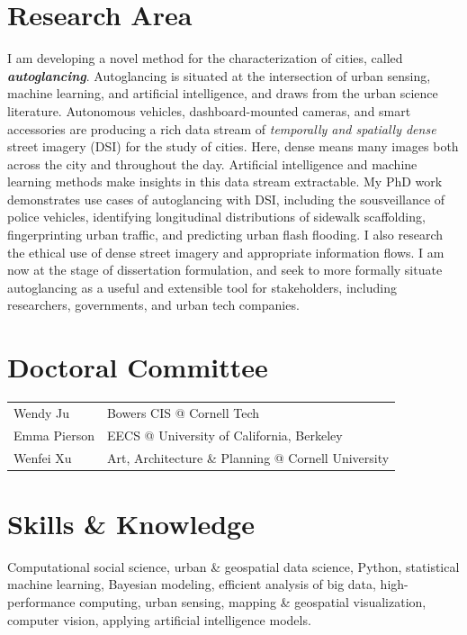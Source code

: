 \documentclass[10pt,letterpaper]{report}
\begin{document}
    \section*{Research Area}
        I am developing a novel method for the characterization of cities, called \textit{\textbf{autoglancing}}. Autoglancing is situated at the intersection of urban sensing, machine learning, and artificial intelligence, and draws from the urban science literature. Autonomous vehicles, dashboard-mounted cameras, and smart accessories are producing a rich data stream of \textit{temporally and spatially dense} street imagery (DSI) for the study of cities. Here, dense means many images both across the city and throughout the day. Artificial intelligence and machine learning methods make insights in this data stream extractable. My PhD work demonstrates use cases of autoglancing with DSI, including the sousveillance of police vehicles, identifying longitudinal distributions of sidewalk scaffolding, fingerprinting urban traffic, and predicting urban flash flooding. I also research the ethical use of dense street imagery and appropriate information flows. I am now at the stage of dissertation formulation, and seek to more formally situate autoglancing as a useful and extensible tool for stakeholders, including researchers, governments, and urban tech companies.

    \section*{Doctoral Committee}
    \begin{tabular}{l | l}
    Wendy Ju & Bowers CIS @ Cornell Tech \\ 
    Emma Pierson & EECS @ University of California, Berkeley \\ 
    Wenfei Xu & Art, Architecture \& Planning @ Cornell University \\ 
    \end{tabular}

    \section*{Skills \& Knowledge}
     Computational social science, urban \& geospatial data science, Python, statistical machine learning, Bayesian modeling, efficient analysis of big data, high-performance computing, urban sensing, mapping \& geospatial visualization, computer vision, applying artificial intelligence models. \newline
\end{document}

